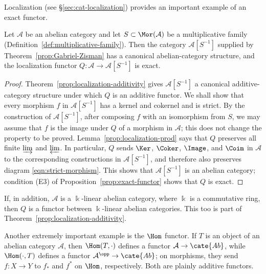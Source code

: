Localization (see \S\ref{sec:cat-localization}) provides an important example
of an exact functor.

\begin{proposition}\label{prop:Abel-cat-localization}
Let $\mathcal{A}$ be an abelian category and let
$S\subset\Mor(\mathcal{A})$ be a multiplicative family
(Definition~\ref{def:multiplicative-family}). Then the category
$\mathcal{A}[S^{-1}]$ supplied by Theorem~\ref{prop:Gabriel-Zisman} has a
canonical abelian-category structure, and the localization functor
$Q:\mathcal{A}\to\mathcal{A}[S^{-1}]$ is exact.
\end{proposition}

\begin{proof}
Theorem~\ref{prop:localization-additivity} gives
$\mathcal{A}[S^{-1}]$ a canonical additive-category structure under which $Q$
is an additive functor. We shall show that every morphism $f$ in
$\mathcal{A}[S^{-1}]$ has a kernel and cokernel and is strict. By the
construction of $\mathcal{A}[S^{-1}]$, after composing $f$ with an isomorphism
from $S$, we may assume that $f$ is the image under $Q$ of a morphism in
$\mathcal{A}$; this does not change the property to be proved.
Lemma~\ref{prop:localization-prod} says that $Q$ preserves all finite
$\varinjlim$ and $\varprojlim$. In particular, $Q$ sends $\Ker$, $\Coker$,
$\Image$, and $\Coim$ in $\mathcal{A}$ to the corresponding constructions in
$\mathcal{A}[S^{-1}]$, and therefore also preserves diagram
\eqref{eqn:strict-morphism}. This shows that $\mathcal{A}[S^{-1}]$ is an
abelian category; condition (E3) of Proposition~\ref{prop:exact-functor} shows
that $Q$ is exact.
\end{proof}

If, in addition, $\mathcal{A}$ is a $\Bbbk$-linear abelian category, where
$\Bbbk$ is a commutative ring, then $Q$ is a functor between $\Bbbk$-linear
abelian categories. This too is part of
Theorem~\ref{prop:localization-additivity}.

Another extremely important example is the $\Hom$ functor. If $T$ is an
object of an abelian category $\mathcal{A}$, then $\Hom(T,\cdot)$ defines a
functor $\mathcal{A}\to\cate{Ab}$, while $\Hom(\cdot,T)$ defines a functor
$\mathcal{A}^{\opp}\to\cate{Ab}$; on morphisms, they send $f:X\to Y$ to
$f_*$ and $f^*$ on $\Hom$, respectively. Both are plainly additive functors.


